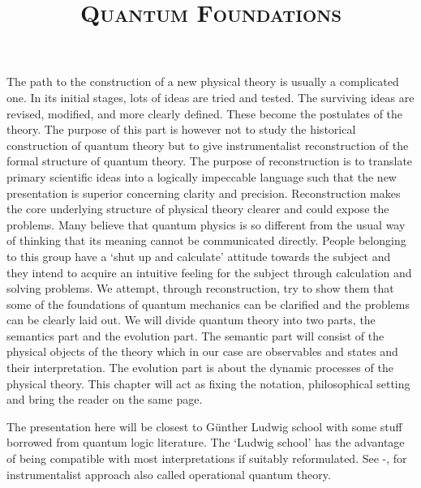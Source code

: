 \documentclass[11pt]{report}
\begin{document}
\clearpage
	
	\title{\Huge \bfseries \textsc{Quantum Foundations}}
	\maketitle
	\rontoc
	\newpage
		\noindent The path to the construction of a new physical theory is usually a complicated one. In its initial stages, lots of ideas are tried and tested. The surviving ideas are revised, modified, and more clearly defined. These become the postulates of the theory. The purpose of this part is however not to study the historical construction of quantum theory but to give instrumentalist reconstruction of the formal structure of quantum theory. The purpose of reconstruction is to translate primary scientific ideas into a logically impeccable language such that the new presentation is superior concerning clarity and precision. Reconstruction makes the core underlying structure of physical theory clearer and could expose the problems. Many believe that quantum physics is so different from the usual way of thinking that its meaning cannot be communicated directly. People belonging to this group have a `shut up and calculate' attitude towards the subject and they intend to acquire an intuitive feeling for the subject through calculation and solving problems. We attempt, through reconstruction, try to show them that some of the foundations of quantum mechanics can be clarified and the problems can be clearly laid out. We will divide quantum theory into two parts, the semantics part and the evolution part. The semantic part will consist of the physical objects of the theory which in our case are observables and states and their interpretation. The evolution part is about the dynamic processes of the physical theory. This chapter will act as fixing the notation, philosophical setting and bring the reader on the same page. 
	
	The presentation here will be closest to G\"unther Ludwig school with some stuff borrowed from quantum logic literature. The `Ludwig school' has the advantage of being compatible with most interpretations if suitably reformulated. See \cite{Ludwig2}-\cite{Busch}, for instrumentalist approach also called operational quantum theory. 
\end{document}
